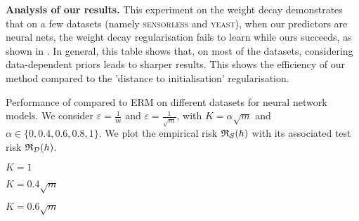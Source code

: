 \begin{noaddcontents}
    \textbf{Analysis of our results.}
    This experiment on the weight decay demonstrates that on a few datasets (namely \textsc{sensorless} and \textsc{yeast}), when our predictors are neural nets, the weight decay regularisation fails to learn while ours succeeds, as shown in .
    In general, this table shows that, on most of the datasets, considering data-dependent priors leads to sharper results.
    This shows the efficiency of our method compared to the 'distance to initialisation' regularisation.
    
    
    \begin{table}[ht]
        \caption{Performance of  compared to ERM on different datasets for neural network models.
    We consider $\varepsilon=\frac{1}{m}$ and $\varepsilon=\frac{1}{\sqrt{m}}$, with $K=\alpha\sqrt{m}$ and $\alpha\in\{0,0.4,0.6,0.8,1\}$.
    We plot the empirical risk $\mathfrak{R}_{\mathcal{S}}(h)$ with its associated test risk $\mathfrak{R}_{\mathcal{D}}(h)$.}
        \begin{adjustbox}{width=0.45\columnwidth}
        \begin{subtable}{0.5\textwidth}
            \centering
            \caption{$K=1$}
            
           \label{tab:sup_nn_batch_0}
        \end{subtable}\end{adjustbox}%
        \hspace{1.0cm}\begin{adjustbox}{width=0.45\columnwidth}
        \begin{subtable}{0.5\textwidth}
            \centering
            \caption{$K=0.4\sqrt{m}$}
            
            \label{tab:sup_nn_batch_4}
        \end{subtable}\end{adjustbox}
        \begin{adjustbox}{width=0.45\columnwidth}
        \begin{subtable}{0.5\textwidth}
            \centering
            \caption{$K=0.6\sqrt{m}$}
            
            \label{tab:sup_nn_batch_6}
        \end{subtable}\end{adjustbox}%
        \hspace{1.0cm}\begin{adjustbox}{width=0.45\columnwidth}

\end{adjustbox}
\end{table}
\end{noaddcontents}
